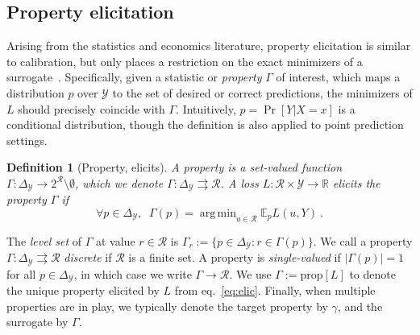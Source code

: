 \documentclass{article}
\newcommand{\Comments}{1}
\newcommand{\mynote}[2]{\ifnum\Comments=1\textcolor{#1}{#2}\fi}
\newcommand{\mytodo}[2]{\ifnum\Comments=1%
	\todo[linecolor=#1!80!black,backgroundcolor=#1,bordercolor=#1!80!black]{#2}\fi}
\newcommand{\raft}[1]{\mytodo{green!20!white}{RF: #1}}
\newcommand{\jessie}[1]{\mynote{purple}{[JF: #1]}}
\newcommand{\reals}{\mathbb{R}}
\newcommand{\simplex}{\Delta_\Y}
\newcommand{\prop}[1]{\mathrm{prop}[#1]}
\newcommand{\E}{\mathbb{E}}
\newcommand{\R}{\mathcal{R}}
\newcommand{\Y}{\mathcal{Y}}
\newcommand{\exploss}[3]{\E_{#3} #1(#2,Y)}
\newcommand{\toto}{\rightrightarrows}
\newtheorem{definition}{Definition}
\DeclareMathOperator*{\argmin}{arg\,min}
\begin{document}
\subsection{Property elicitation}\label{subsec:properties}

Arising from the statistics and economics literature, property elicitation is similar to calibration, but only places a restriction on the exact minimizers of a surrogate~\citep{savage1971elicitation,osband1985information-eliciting,lambert2008eliciting,lambert2009eliciting,lambert2018elicitation,frongillo2015vector-valued,frongillo2014general}.
Specifically, given a statistic or \emph{property} $\Gamma$ of interest, which maps a distribution $p$ over $\Y$ to the set of desired or correct predictions, the minimizers of $L$ should precisely coincide with $\Gamma$.
Intuitively, $p = \Pr[Y|X=x]$ is a conditional distribution, though the definition is also applied to point prediction settings.

\begin{definition}[Property, elicits]
	A \emph{property} is a set-valued function $\Gamma : \simplex \to 2^\R \setminus \emptyset$, which we denote $\Gamma: \simplex \toto \R$.
	A loss $L : \R \times \Y \to \reals$ \emph{elicits} the property $\Gamma$ if
	\begin{equation}
    \label{eq:elic}    
    \forall p \in \simplex, \;\; \Gamma(p) = \argmin_{u \in \R} \exploss{L}{u}{p}~.
	\end{equation}
\end{definition}

The \emph{level set} of $\Gamma$ at value $r\in\R$ is $\Gamma_r := \{p \in \simplex : r \in \Gamma(p)\}$.
We call a property $\Gamma: \simplex \toto \R$ \emph{discrete} if $\R$ is a finite set.
A property is \emph{single-valued} if $|\Gamma(p)| = 1$ for all $p\in\simplex$, in which case we write $\Gamma\to\R$.
We use $\Gamma := \prop{L}$ to denote the unique property elicited by $L$ from eq.~\eqref{eq:elic}.
Finally, when multiple properties are in play, we typically denote the target property by $\gamma$, and the surrogate by $\Gamma$.
\end{document}
